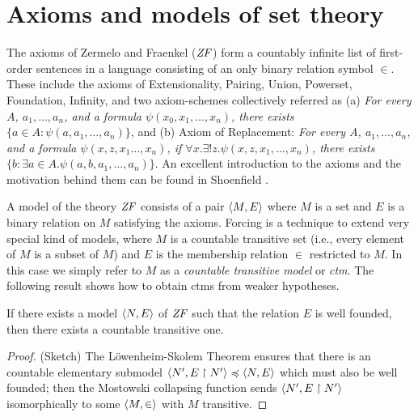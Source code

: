 \section{Axioms and models of set theory}
\label{sec:axioms-models-set-theory}

The axioms of Zermelo and Fraenkel ($\mathit{ZF}$) form a
countably infinite list of first-order sentences in a language
consisting of an only binary relation symbol $\in$. These include the
axioms of Extensionality, Pairing, Union, Powerset, Foundation, Infinity, and two
axiom-schemes collectively referred as
(a) \emph{For every $A$, $a_1,\dots,a_n$,  and  a formula
  $\psi(x_0,x_1,\dots,x_n)$, there exists $\{a\in  A:
  \psi(a,a_1,\dots,a_n)\}$}, 
and (b) Axiom of Replacement: \emph{For every $A$, $a_1,\dots,a_n$,  and
  a formula   $\psi(x,z,x_1\dots,x_n)$, if 
  $\forall x.\exists!z.\psi(x,z,x_1,\dots,x_n)$,  there exists 
  $\{b : \exists a\in A. \psi(a,b,a_1,\dots,a_n)\}$}.
An excellent introduction to the axioms and the motivation behind them
can be found in Shoenfield \cite{MR3727410}. 

A model of the theory $\mathit{ZF}$ consists of a pair $\langle M,E\rangle$ where $M$
is a set and $E$ is a binary relation on $M$ satisfying the
axioms. Forcing is a technique 
to extend very special kind of models, where $M$ is a countable
transitive set (i.e., every element of $M$ is a subset of $M$) and
$E$ is the membership relation $\in$ restricted to $M$. In this case
we simply refer to $M$ as a \emph{countable transitive model} or
\emph{ctm}. The following result shows how to obtain ctms from weaker
hypotheses. 
%
\begin{lemma}\label{lem:wf-model-implies-ctm}
  If there exists  a
  model  $\langle N,E\rangle$  of $\mathit{ZF}$ such that the relation $E$ is well
  founded, then there exists a countable transitive one.
\end{lemma}
\begin{proof}
  (Sketch) The L\"owenheim-Skolem 
  Theorem ensures that there is an countable elementary submodel 
  $\langle N',E\upharpoonright N'\rangle\preccurlyeq  \langle N,E\rangle$ which must also be
  well founded; then the 
  Mostowski collapsing function \cite[Def.~I.9.31]{kunen2011set} sends $\langle
  N',E\upharpoonright N'\rangle$ 
  isomorphically to some $\langle M,\in\rangle$ with  $M$ transitive.
\end{proof}

